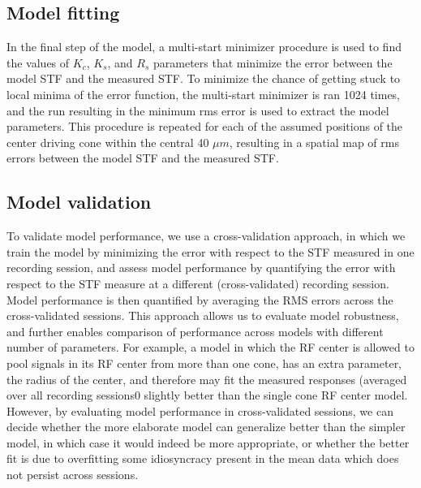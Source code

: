 \documentclass[11pt, oneside]{article}   	%
\begin{document}
\subsection{Model fitting}
In the final step of the model, a multi-start minimizer procedure is used to find the values of $K_c$, $K_s$, and $R_s$ parameters that minimize the error between the model STF and the measured STF. To minimize the chance of getting stuck to local minima of the error function, the multi-start minimizer is ran 1024 times, and the run resulting in the minimum rms error is used to extract the model parameters. This procedure is repeated for each of the assumed positions of the center driving cone within the central 40 $\mu m$, resulting in a spatial map of rms errors between the model STF and the measured STF.

\subsection{Model validation}
To validate model performance, we use a cross-validation approach, in which we train the model by minimizing the error with respect to the STF measured in one recording session, and assess model performance by quantifying the error with respect to the STF measure at a different (cross-validated) recording session. Model performance is then quantified by averaging the RMS errors across the cross-validated sessions. This approach allows us to evaluate model robustness, and further enables comparison of performance across models with different number of parameters. For example, a model in which the RF center is allowed to pool signals in its RF center from more than one cone, has an extra parameter, the radius of the center, and therefore may fit the measured responses (averaged over all recording sessions0 slightly better than the single cone RF center model. However, by evaluating model performance in cross-validated sessions, we can decide whether the more elaborate model can generalize better than the simpler model, in which case it would indeed be more appropriate, or whether the better fit is due to overfitting some idiosyncracy present in the mean data which does not persist across sessions.

\newpage
\end{document}
